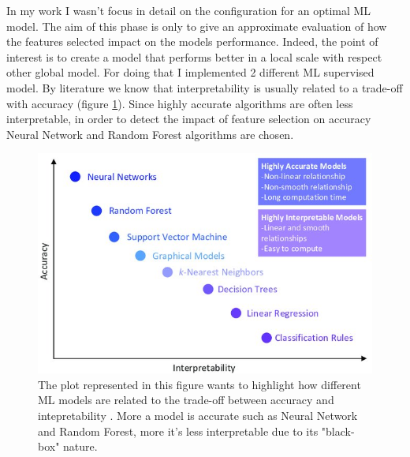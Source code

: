 In my work I wasn't focus in detail on the configuration for an optimal ML model. The aim of this phase is only to give an approximate evaluation of how the features selected impact on the models performance. Indeed, the point of interest is to create a model that performs better in a local scale with respect other global model.
For doing that I implemented 2 different ML supervised model.
By literature we know that interpretability is usually related to a trade-off with accuracy (figure \ref{fig:trade-off}).
Since highly accurate algorithms are often less interpretable, in order to detect the impact of feature selection on accuracy Neural Network and Random Forest algorithms are chosen. 
\begin{figure}[H]
    \centering
    \includegraphics[scale=1.4]{images/interpretability_accuracy_tradeoff.jpg}
    \caption{The plot represented in this figure wants to highlight how different ML models are related to the trade-off between accuracy and intepretability \cite{morocho2019machine}. More a model is accurate such as Neural Network and Random Forest, more it's less interpretable due to its "black-box" nature.}
    \label{fig:trade-off}
\end{figure}
